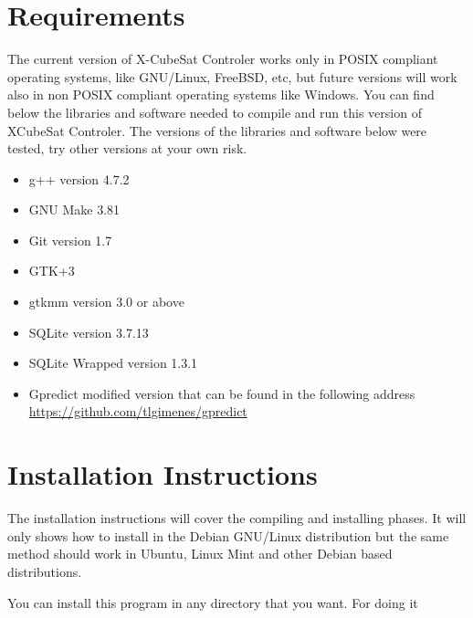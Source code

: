 \documentclass[pdftex,11pt,a4paper,titlepage]{report}
\begin{document}
\chapter{Requirements}
\hspace{0.4cm} The current version of X-CubeSat Controler works only in POSIX compliant operating systems, like GNU/Linux, FreeBSD, etc, but future versions will work also in non POSIX compliant operating systems like Windows. You can find below the libraries and software needed to compile and run this version of XCubeSat Controler. The versions of the libraries and software below were tested, try other versions at your own risk.
\begin{itemize}
\item g++ version 4.7.2
\item GNU Make 3.81
\item Git version 1.7
\item GTK+3 
\item gtkmm version 3.0 or above
\item SQLite version 3.7.13
\item SQLite Wrapped version 1.3.1
\item Gpredict modified version that can be found in the following address \url{https://github.com/tlgimenes/gpredict} 
\end{itemize} 

\chapter{Installation Instructions}
\hspace{0.4cm} The installation instructions will cover the compiling and installing phases. It will only shows how to install in the Debian GNU/Linux distribution but the same method should work in Ubuntu, Linux Mint and other Debian based distributions.

You can install this program in any directory that you want. For doing it 
\end{document}
